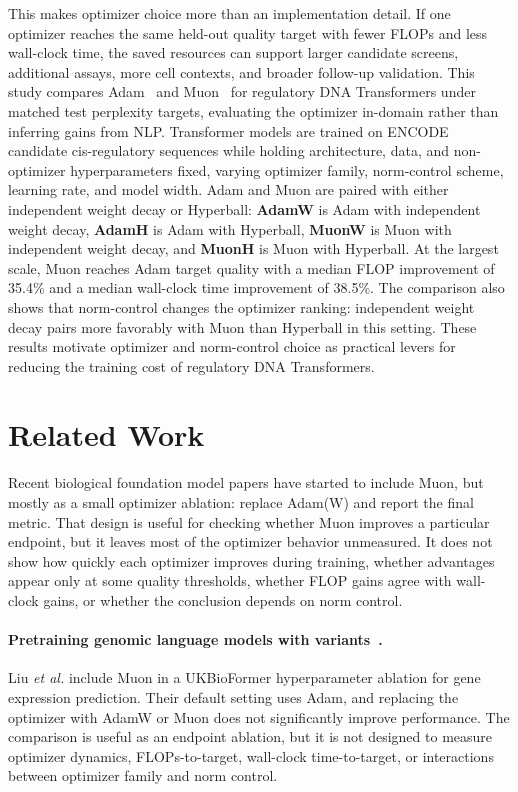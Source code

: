 \documentclass{article}
\begin{document}
This makes optimizer choice more than an implementation detail. If one optimizer reaches the same held-out quality target with fewer FLOPs and less wall-clock time, the saved resources can support larger candidate screens, additional assays, more cell contexts, and broader follow-up validation. This study compares Adam~\citep{adam} and Muon~\citep{muon} for regulatory DNA Transformers under matched test perplexity targets, evaluating the optimizer in-domain rather than inferring gains from NLP. Transformer models are trained on ENCODE candidate cis-regulatory sequences while holding architecture, data, and non-optimizer hyperparameters fixed, varying optimizer family, norm-control scheme, learning rate, and model width. Adam and Muon are paired with either independent weight decay or Hyperball: \textbf{AdamW} is Adam with independent weight decay, \textbf{AdamH} is Adam with Hyperball, \textbf{MuonW} is Muon with independent weight decay, and \textbf{MuonH} is Muon with Hyperball. At the largest scale, Muon reaches Adam target quality with a median FLOP improvement of 35.4\% and a median wall-clock time improvement of 38.5\%. The comparison also shows that norm-control changes the optimizer ranking: independent weight decay pairs more favorably with Muon than Hyperball in this setting. These results motivate optimizer and norm-control choice as practical levers for reducing the training cost of regulatory DNA Transformers.


\section{Related Work}
\label{sec:related-work}

Recent biological foundation model papers have started to include Muon, but mostly as a small optimizer ablation: replace Adam(W) and report the final metric. That design is useful for checking whether Muon improves a particular endpoint, but it leaves most of the optimizer behavior unmeasured. It does not show how quickly each optimizer improves during training, whether advantages appear only at some quality thresholds, whether FLOP gains agree with wall-clock gains, or whether the conclusion depends on norm control.

\paragraph{Pretraining genomic language models with variants~\citep{ukbiobert}.} Liu \emph{et al.} include Muon in a UKBioFormer hyperparameter ablation for gene expression prediction. Their default setting uses Adam, and replacing the optimizer with AdamW or Muon does not significantly improve performance. The comparison is useful as an endpoint ablation, but it is not designed to measure optimizer dynamics, FLOPs-to-target, wall-clock time-to-target, or interactions between optimizer family and norm control.
\end{document}
